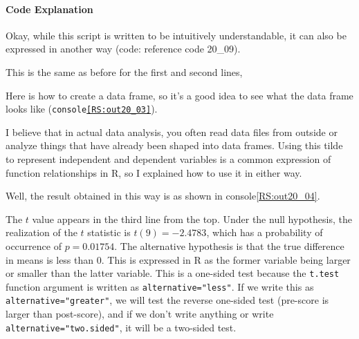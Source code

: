 \documentclass{ltjsbook}
\begin{document}
\paragraph{Code Explanation}

Okay, while this script is written to be intuitively understandable, it can also be expressed in another way (code: reference code 20_09).


This is the same as before for the first and second lines,


Here is how to create a data frame, so it's a good idea to see what the data frame looks like (\texttt{console\ref{RS:out20_03}}).


I believe that in actual data analysis, you often read data files from outside or analyze things that have already been shaped into data frames. Using this tilde to represent independent and dependent variables is a common expression of function relationships in R, so I explained how to use it in either way.

Well, the result obtained in this way is as shown in console\ref{RS:out20_04}.


The $t$ value appears in the third line from the top. Under the null hypothesis, the realization of the $t$ statistic is $t(9)=-2.4783$, which has a probability of occurrence of $p=0.01754$. The alternative hypothesis is that the true difference in means is less than 0. This is expressed in R as the former variable being larger or smaller than the latter variable. This is a one-sided test because the \texttt{t.test} function argument is written as \texttt{alternative="less"}. If we write this as \texttt{alternative="greater"}, we will test the reverse one-sided test (pre-score is larger than post-score), and if we don’t write anything or write \texttt{alternative="two.sided"}, it will be a two-sided test.
\end{document}
